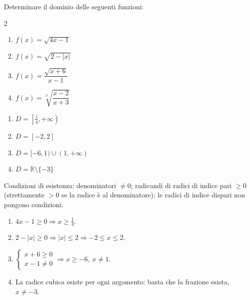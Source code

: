 \begin{question}[ID=2.2, subtitle={Dominio di funzioni irrazionali con radicali}, difficulty=facile, tags={dominio,radicali}]
Determinare il dominio delle seguenti funzioni:

\begin{center}\begin{minipage}{0.92\linewidth}
\begin{multicols}{2}
\begin{enumerate}[leftmargin=3.2cm]
\item $f(x)=\sqrt{4x-1}$
\item $f(x)=\sqrt{2-|x|}$
\item $f(x)=\dfrac{\sqrt{x+6}}{x-1}$
\item $f(x)=\sqrt[3]{\dfrac{x-2}{x+3}}$
\end{enumerate}
\end{multicols}
\end{minipage}\end{center}
\begin{solution}
\begin{enumerate}
    \item $D=\left[\tfrac14,+\infty\right)$
    \item $D=[-2,2]$
    \item $D=[-6,1)\cup(1,+\infty)$
    \item $D=\mathbb{R}\setminus\{-3\}$
\end{enumerate}
\end{solution}
\begin{explanation}
Condizioni di esistenza: denominatori $\neq0$; radicandi di radici di indice pari $\geq0$ (strettamente $>0$ se la radice è al denominatore); le radici di indice dispari non pongono condizioni.
\begin{enumerate}
    \item $4x-1\geq0 \Rightarrow x\geq\tfrac14$.
    \item $2-|x|\geq0 \Rightarrow |x|\leq2 \Rightarrow -2\leq x\leq2$.
    \item $\begin{cases} x+6\geq0\\ x-1\neq0\end{cases} \Rightarrow x\geq-6,\ x\neq1$.
    \item La radice cubica esiste per ogni argomento: basta che la frazione esista, $x\neq-3$.
\end{enumerate}
\end{explanation}
\end{question}

